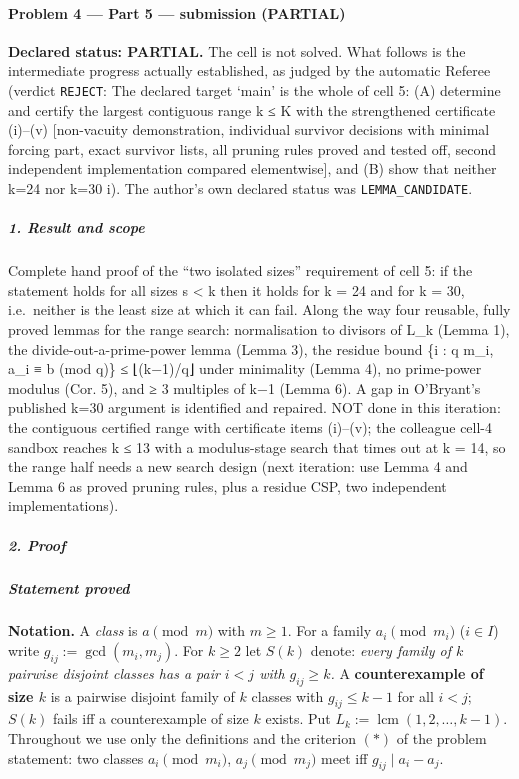 \documentclass[11pt,a4paper]{article}
\begin{document}
\paragraph{Problem 4 --- Part 5 --- submission
(PARTIAL)}\label{problem-4-part-5-submission-partial}

\textbf{Declared status: PARTIAL.} The cell is not solved. What follows
is the intermediate progress actually established, as judged by the
automatic Referee (verdict \texttt{REJECT}: The declared target `main'
is the whole of cell 5: (A) determine and certify the largest contiguous
range k ≤ K with the strengthened certificate (i)--(v) {[}non-vacuity
demonstration, individual survivor decisions with minimal forcing part,
exact survivor lists, all pruning rules proved and tested off, second
independent implementation compared elementwise{]}, and (B) show that
neither k=24 nor k=30 i). The author's own declared status was
\texttt{LEMMA\_CANDIDATE}.

\subparagraph{1. Result and scope}\label{result-and-scope}

Complete hand proof of the ``two isolated sizes'' requirement of cell 5:
if the statement holds for all sizes s \textless{} k then it holds for k
= 24 and for k = 30, i.e.~neither is the least size at which it can
fail. Along the way four reusable, fully proved lemmas for the range
search: normalisation to divisors of L\_k (Lemma 1), the
divide-out-a-prime-power lemma (Lemma 3), the residue bound \textbar\{i
: q \textbar{} m\_i, a\_i ≡ b (mod q)\}\textbar{} ≤ ⌊(k−1)/q⌋ under
minimality (Lemma 4), no prime-power modulus (Cor. 5), and ≥ 3 multiples
of k−1 (Lemma 6). A gap in O'Bryant's published k=30 argument is
identified and repaired. NOT done in this iteration: the contiguous
certified range with certificate items (i)--(v); the colleague cell-4
sandbox reaches k ≤ 13 with a modulus-stage search that times out at k =
14, so the range half needs a new search design (next iteration: use
Lemma 4 and Lemma 6 as proved pruning rules, plus a residue CSP, two
independent implementations).

\subparagraph{2. Proof}\label{proof}

\subparagraph{Statement proved}\label{statement-proved}

\textbf{Notation.} A \emph{class} is \(a \pmod m\) with \(m\ge1\). For a
family \(a_i \pmod{m_i}\) (\(i\in I\)) write \(g_{ij}:=\gcd(m_i,m_j)\).
For \(k\ge2\) let \(S(k)\) denote: \emph{every family of \(k\) pairwise
disjoint classes has a pair \(i<j\) with \(g_{ij}\ge k\).} A
\textbf{counterexample of size \(k\)} is a pairwise disjoint family of
\(k\) classes with \(g_{ij}\le k-1\) for all \(i<j\); \(S(k)\) fails iff
a counterexample of size \(k\) exists. Put
\(L_k:=\operatorname{lcm}(1,2,\dots,k-1)\). Throughout we use only the
definitions and the criterion \((*)\) of the problem statement: two
classes \(a_i \pmod{m_i}\), \(a_j\pmod{m_j}\) meet iff
\(g_{ij}\mid a_i-a_j\).
\end{document}
